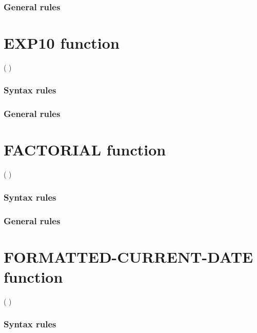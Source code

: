 \subsubsection{General rules}

\section{EXP10 function}

\begin{syntax}
    ( \argument )
\end{syntax}

\subsubsection{Syntax rules}

\subsubsection{General rules}

\section{FACTORIAL function}

\begin{syntax}
    ( \argument )
\end{syntax}

\subsubsection{Syntax rules}

\subsubsection{General rules}

\section{FORMATTED-CURRENT-DATE function}

\begin{syntax}
    ( \argument )
\end{syntax}

\subsubsection{Syntax rules}

